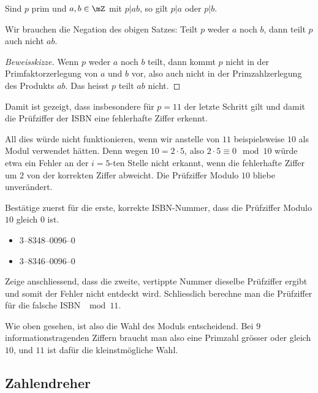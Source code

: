 \documentclass[%
11pt,%
twoside,%
titlepage,%
german,%
headsepline%
]{scrartcl}
\begin{document}
\begin{csatz}[Primfaktorsatz]
Sind $p$ prim und $a,b\in\mZ$ mit $p|ab$, so gilt $p|a$ oder $p|b$.
\end{csatz}

Wir brauchen die Negation des obigen Satzes: Teilt $p$ weder $a$ noch $b$, dann teilt $p$ auch nicht $ab$.

\begin{proof}[Beweisskizze]
Wenn $p$ weder $a$ noch $b$ teilt, dann kommt $p$ nicht in der Primfaktorzerlegung von $a$ und $b$ vor, also auch nicht in der Primzahlzerlegung des Produkts $ab$. Das heisst $p$ teilt $ab$ nicht.
\end{proof}

Damit ist gezeigt, dass insbesondere für $p=11$ der letzte Schritt gilt und damit die Prüfziffer der ISBN eine fehlerhafte Ziffer erkennt.

\begin{bem}
All dies würde nicht funktionieren, wenn wir anstelle von $11$ beispielsweise $10$ als Modul verwendet hätten. Denn wegen $10=2\cdot5$, also $2\cdot5\equiv0\mod10$ würde etwa ein Fehler an der $i=5$-ten Stelle nicht erkannt, wenn die fehlerhafte Ziffer um $2$ von der korrekten Ziffer abweicht. Die Prüfziffer Modulo $10$ bliebe unverändert.
\end{bem}
\begin{ueb}
Bestätige zuerst für die erste, korrekte ISBN-Nummer, dass die Prüfziffer Modulo $10$ gleich $0$ ist.
\begin{itemize}
\item 3--8348--0096--0
\item 3--8346--0096--0
\end{itemize}
Zeige anschliessend, dass die zweite, vertippte Nummer dieselbe Prüfziffer ergibt und somit der Fehler nicht entdeckt wird. Schliesslich berechne man die Prüfziffer für die falsche ISBN $\mod 11$.
\end{ueb}

\begin{bem}
Wie oben gesehen, ist also die Wahl des Moduls entscheidend. Bei $9$ informationstragenden Ziffern braucht man also eine Primzahl grösser oder gleich $10$, und $11$ ist dafür die kleinstmögliche Wahl.
\end{bem}

\subsection{Zahlendreher}
\end{document}
